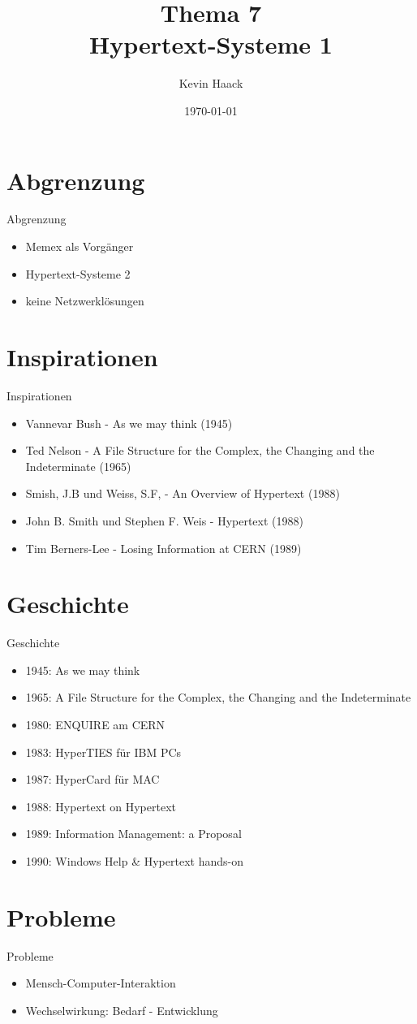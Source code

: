 \documentclass{beamer}
\title{Thema 7\\Hypertext-Systeme 1}
\author{Kevin Haack}
\institute{Paderborn University}
\date{\today}
\begin{document}
\begin{frame}
  \titlepage
\end{frame}


\section{Abgrenzung}
\begin{frame}{Abgrenzung}
	\begin{itemize}
		\item Memex als Vorgänger
		\item Hypertext-Systeme 2
		\item keine Netzwerklösungen
	\end{itemize}
\end{frame}

\section{Inspirationen}
\begin{frame}{Inspirationen}
	\begin{itemize}
		\item Vannevar Bush - As we may think (1945)
		\item Ted Nelson - A File Structure for the Complex, the Changing and the Indeterminate (1965)
		\item Smish, J.B und Weiss, S.F, - An Overview of Hypertext (1988)
		\item John B. Smith und Stephen F. Weis - Hypertext (1988)
		\item Tim Berners-Lee - Losing Information at CERN (1989)
	\end{itemize}
\end{frame}

\section{Geschichte}
\begin{frame}{Geschichte}
\begin{itemize}
	\item 1945: As we may think
	\item 1965: A File Structure for the Complex, the Changing and the Indeterminate
	\item 1980: ENQUIRE am CERN
	\item 1983: HyperTIES für IBM PCs
	\item 1987: HyperCard für MAC
	\item 1988: Hypertext on Hypertext
	\item 1989: Information Management: a Proposal
	\item 1990: Windows Help \& Hypertext hands-on
	\end{itemize}
\end{frame}

\section{Probleme}
\begin{frame}{Probleme}
\begin{itemize}
	\item Mensch-Computer-Interaktion
	\item Wechselwirkung: Bedarf - Entwicklung
	\end{itemize}
\end{frame}
\end{document}
